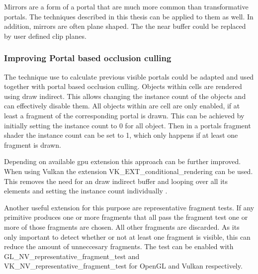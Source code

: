Mirrors are a form of a portal that are much more common than transformative portals. The techniques described in this thesis can be applied to them as well. In addition, mirrors are often plane shaped. The the near buffer could be replaced by user defined clip planes.


\subsubsection{Improving Portal based occlusion culling}
The technique use to calculate previous visible portals could be adapted and used together with portal based occlusion culling. Objects within cells are rendered using draw indirect. This allows changing the instance count of the objects and can effectively disable them. All objects within are cell are only enabled, if at least a fragment of the corresponding portal is drawn. This can be achieved by initially setting the instance count to 0 for all object. Then in a portals fragment shader the instance count can be set to 1, which only happens if at least one fragment is drawn.

Depending on  available \gls{gpu} extension this approach can be further improved. When using Vulkan the extension VK\_EXT\_conditional\_rendering can be used. This removes the need for an draw indirect buffer and looping over all its elements and setting the instance count individually \cite{khronos:vulkan:spec1.1}.

Another useful extension for this purpose are representative fragment tests. If any primitive produces one or more fragments that all pass the fragment test one or more of those fragments are chosen. All other fragments are discarded. As its only important to detect whether or not at least one fragment is visible, this can reduce the amount of unneccesary fragments. The test can be enabled with GL\_NV\_representative\_fragment\_test and VK\_NV\_representative\_fragment\_test for OpenGL \cite{khronos:openGL:representative} and Vulkan\cite{khronos:vulkan:spec1.1} respectively.




